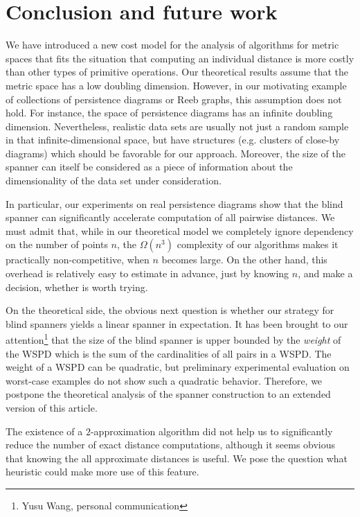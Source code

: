 \documentclass[]{ws-ijcga}
\begin{document}
\section{Conclusion and future work}
\label{sec:conclusion}
%
We have introduced a new cost model for the analysis of algorithms
for metric spaces that fits the situation that computing an individual distance
is more costly than other types of primitive operations.
Our theoretical results assume
that the metric space has a low doubling dimension.
However, in our motivating example of collections of persistence diagrams
or Reeb graphs, this assumption does not hold. For instance,
the space of persistence diagrams has an infinite doubling dimension.
Nevertheless, realistic data sets are usually not just a random sample
in that infinite-dimensional space, but have structures
(e.g. clusters of close-by diagrams) which should be favorable for our approach.
Moreover, the size of the \bgrdy spanner can itself be considered as a piece
of information about the dimensionality of the data set under consideration.


In particular, our experiments on real persistence diagrams
show that the blind spanner can significantly accelerate
computation of all pairwise distances. We must admit that,
while in our theoretical model we completely ignore dependency on the number of points $n$,
the $\Omega(n^3)$ complexity of our algorithms makes it practically
non-competitive, when $n$ becomes large.
On the other hand, this overhead is relatively easy to estimate
in advance, just by knowing $n$, and make a decision,
whether \bgrdy is worth trying. 


On the theoretical side, the obvious next question is whether our strategy
for blind spanners yields a linear spanner in expectation. 
It has been brought to our attention\footnote{Yusu Wang, personal communication}
that the size of the blind spanner is upper bounded by the \emph{weight} of the WSPD
which is the sum of the  cardinalities of all pairs in a WSPD.
The weight of a WSPD can be quadratic, but preliminary
experimental evaluation on worst-case examples do not show such a quadratic
behavior. Therefore, we postpone the theoretical analysis of the spanner construction
to an extended version of this article.

The existence of a $2$-approximation algorithm did not help us to significantly
reduce the number of exact distance computations, although it seems obvious
that knowing the all approximate distances is useful.
We pose the question what heuristic could make more use of this feature.
\end{document}
